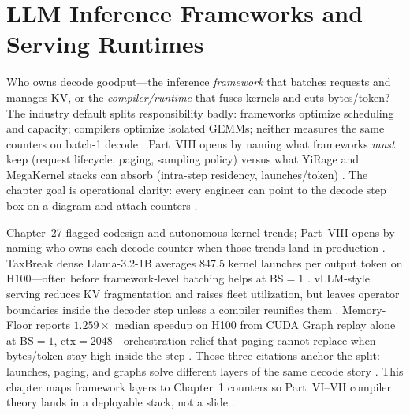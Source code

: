 \chapter{LLM Inference Frameworks and Serving Runtimes}
\label{chap:ch28}

Who owns decode goodput---the inference \emph{framework} that batches requests and manages KV, or the \emph{compiler/runtime} that fuses kernels and cuts bytes/token? The industry default splits responsibility badly: frameworks optimize scheduling and capacity; compilers optimize isolated GEMMs; neither measures the same counters on batch-1 decode \citep{patel2025llminference,taxbreak2026,memoryfloor2026,kwon2023vllm,yirage2026}. Part~VIII opens by naming what frameworks \emph{must} keep (request lifecycle, paging, sampling policy) versus what YiRage and MegaKernel stacks can absorb (intra-step residency, launches/token) \citep{chen2020compilerbasedhardw,liu2024deepseekv3,nvidia2024cudagraphs,dao2022flashattention,dlbook}. The chapter goal is operational clarity: every engineer can point to the decode step box on a diagram and attach counters \citep{patel2025llminference,taxbreak2026,memoryfloor2026,yirage2026,chen2020compilerbasedhardw,kwon2023vllm,dlbook}.

Chapter~27 flagged codesign and autonomous-kernel trends; Part~VIII opens by naming who owns each decode counter when those trends land in production \citep{yirage2026,chen2020compilerbasedhardw,patel2025llminference}. TaxBreak dense Llama-3.2-1B averages 847.5 kernel launches per output token on H100---often before framework-level batching helps at BS${=}1$ \citep{taxbreak2026}. vLLM-style serving reduces KV fragmentation and raises fleet utilization, but leaves operator boundaries inside the decoder step unless a compiler reunifies them \citep{kwon2023vllm,patel2025llminference,memoryfloor2026,yirage2026}. Memory-Floor reports $1.259\times$ median speedup on H100 from CUDA Graph replay alone at BS${=}1$, ctx${=}2048$---orchestration relief that paging cannot replace when bytes/token stay high inside the step \citep{memoryfloor2026,nvidia2024cudagraphs}. Those three citations anchor the split: launches, paging, and graphs solve different layers of the same decode story \citep{taxbreak2026,memoryfloor2026,kwon2023vllm,nvidia2024cudagraphs,patel2025llminference,yirage2026,chen2020compilerbasedhardw,dlbook}. This chapter maps framework layers to Chapter~1 counters so Part~VI--VII compiler theory lands in a deployable stack, not a slide \citep{chen2020compilerbasedhardw,taxbreak2026,semianalysis2024tma,amd2024xdna,amd2024aie}.

